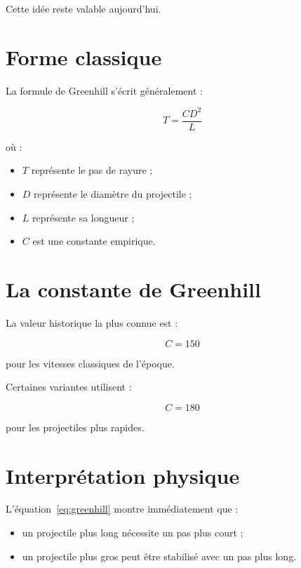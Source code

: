 Cette idée reste valable aujourd'hui.

\section{Forme classique}

La formule de Greenhill s'écrit généralement :

\begin{equation}
T=\frac{C D^2}{L}
\label{eq:greenhill}
\end{equation}

où :

\begin{itemize}
    \item $T$ représente le pas de rayure ;
    \item $D$ représente le diamètre du projectile ;
    \item $L$ représente sa longueur ;
    \item $C$ est une constante empirique.
\end{itemize}

\section{La constante de Greenhill}

La valeur historique la plus connue est :

\begin{equation}
C = 150
\end{equation}

pour les vitesses classiques de l'époque.

Certaines variantes utilisent :

\begin{equation}
C = 180
\end{equation}

pour les projectiles plus rapides.

\section{Interprétation physique}

L'équation~\ref{eq:greenhill} montre immédiatement que :

\begin{itemize}
    \item un projectile plus long nécessite un pas plus court ;
    \item un projectile plus gros peut être stabilisé avec un pas plus long.
\end{itemize}

